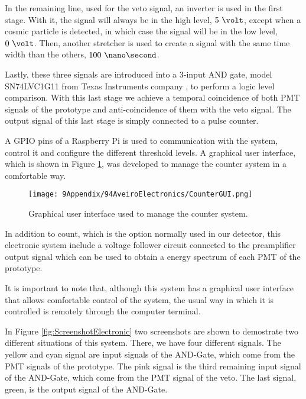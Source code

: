 \begin{enumerate}
In the remaining line, used for the veto signal, an inverter is used in the first stage. With it, the signal will always be in the high level, $5~\volt$, except when a cosmic particle is detected, in which case the signal will be in the low level, $0~\volt$. Then, another stretcher is used to create a signal with the same time width than the others, $100~\nano\second$.

Lastly, these three signals are introduced into a 3-input AND gate, model SN74LVC1G11 from Texas Instruments company \cite{ANDGate}, to perform a logic level comparison. With this last stage we achieve a temporal coincidence of both PMT signals of the prototype and anti-coincidence of them with the veto signal. The output signal of this last stage is simply connected to a pulse counter. 

A GPIO pins of a Raspberry Pi is used to communication with the system, control it and configure the different threshold levels. A graphical user interface, which is shown in Figure \ref{fig:GUIcounts}, was developed to manage the counter system in a comfortable way.

 \begin{figure}[h]
\centering
\texttt{[image: 9Appendix/94AveiroElectronics/CounterGUI.png]}
\caption{Graphical user interface used to manage the counter system. \label{fig:GUIcounts}}
\end{figure}

In addition to count, which is the option normally used in our detector, this electronic system include a voltage follower circuit connected to the preamplifier output signal which can be used to obtain a energy spectrum of each PMT of the prototype.

It is important to note that, although this system has a graphical user interface that allows comfortable control of the system, the usual way in which it is controlled is remotely through the computer terminal.

In Figure \ref{fig:ScreenshotElectronic} two screenshots are shown to demostrate two different situations of this system. There, we have four different signals. The yellow and cyan signal are input signals of the AND-Gate, which come from the PMT signals of the prototype. The pink signal is the third remaining input signal of the AND-Gate, which come from the PMT signal of the veto. The last signal, green, is the output signal of the AND-Gate.


\end{enumerate}
